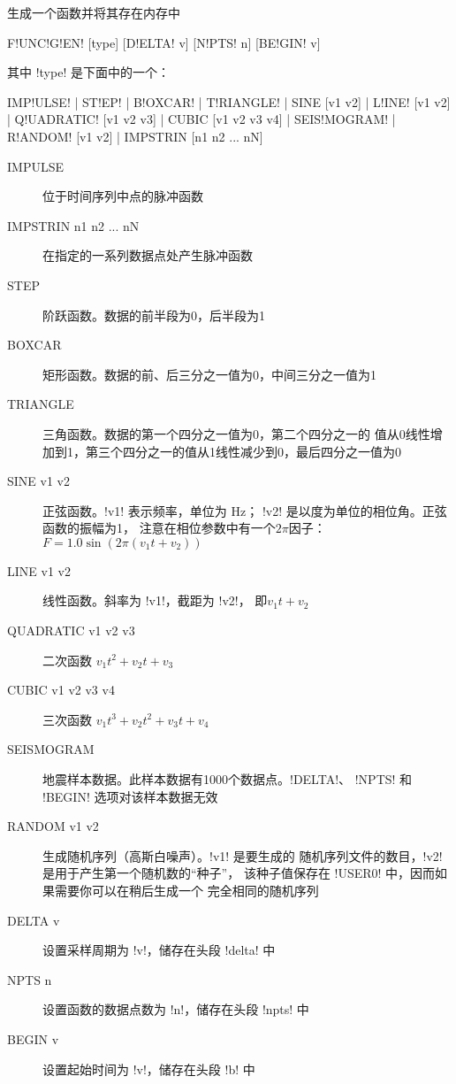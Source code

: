 \label{cmd:funcgen}

生成一个函数并将其存在内存中

\begin{SACSTX}
F!UNC!G!EN! [type] [D!ELTA! v] [N!PTS! n] [BE!GIN! v]
\end{SACSTX}
其中 !type! 是下面中的一个：
\begin{SACSTX}
IMP!ULSE! | ST!EP! | B!OXCAR! | T!RIANGLE! | SINE [v1 v2] | L!INE! [v1 v2] |
Q!UADRATIC! [v1 v2 v3] | CUBIC [v1 v2 v3 v4] | SEIS!MOGRAM! |
R!ANDOM! [v1 v2] | IMPSTRIN  [n1 n2 ... nN]
\end{SACSTX}

\begin{description}
\item [IMPULSE] 位于时间序列中点的脉冲函数
\item [IMPSTRIN n1 n2 ... nN] 在指定的一系列数据点处产生脉冲函数
\item [STEP] 阶跃函数。数据的前半段为0，后半段为1
\item [BOXCAR] 矩形函数。数据的前、后三分之一值为0，中间三分之一值为1
\item [TRIANGLE] 三角函数。数据的第一个四分之一值为0，第二个四分之一的
    值从0线性增加到1，第三个四分之一的值从1线性减少到0，最后四分之一值为0
\item [SINE v1 v2] 正弦函数。!v1! 表示频率，单位为 \si{\Hz}；
    !v2! 是以度为单位的相位角。正弦函数的振幅为1，
    注意在相位参数中有一个$2\pi$因子：$F = 1.0 \sin (2\pi (v_1t+v_2))$
\item [LINE v1 v2] 线性函数。斜率为 !v1!，截距为 !v2!，
    即$ v_1 t + v_2 $
\item [QUADRATIC v1 v2 v3] 二次函数 $v_1 t^{2} + v_2 t + v_3 $
\item [CUBIC v1 v2 v3 v4] 三次函数 $ v_1 t^{3} + v_2 t^2 + v_3t + v_4 $
\item [SEISMOGRAM] 地震样本数据。此样本数据有1000个数据点。!DELTA!、
    !NPTS! 和 !BEGIN! 选项对该样本数据无效
\item [RANDOM v1 v2] 生成随机序列（高斯白噪声）。!v1! 是要生成的
    随机序列文件的数目，!v2! 是用于产生第一个随机数的``种子''，
    该种子值保存在 !USER0! 中，因而如果需要你可以在稍后生成一个
    完全相同的随机序列
\item [DELTA v] 设置采样周期为 !v!，储存在头段 !delta! 中
\item [NPTS n] 设置函数的数据点数为 !n!，储存在头段 !npts! 中
\item [BEGIN v] 设置起始时间为 !v!，储存在头段 !b! 中
\end{description}

